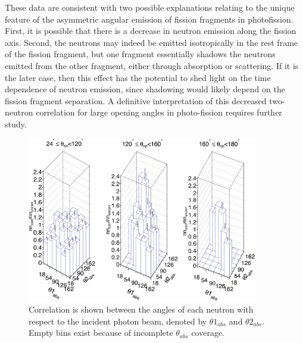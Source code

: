 These data are consistent with two possible explanations relating to the unique feature of the asymmetric angular emission of fission fragments in photofission.
First, it is possible that there is a decrease in neutron emission along the fission axis.
Second, the neutrons may indeed be emitted isotropically in the rest frame of the fission fragment, but one fragment essentially shadows the neutrons emitted from the other fragment, either through absorption or scattering.
If it is the later case, then this effect has the potential to shed light on the time dependence of neutron emission, since shadowing would likely depend on the fission fragment separation.
A definitive interpretation of this decreased two-neutron correlation for large opening angles in photo-fission requires further study.

\begin{figure}
\centering
    \includegraphics[width = 0.9\textwidth]{Content/Results/theta_abs_LEGO.png}
    \caption{Correlation is shown between the angles of each neutron with respect to the incident photon beam, denoted by $\theta 1_{abs}$ and $\theta 2_{abs}$.
    Empty bins exist because of incomplete $\theta_{abs}$ coverage.}
    \label{fig:theta_abs_LEGO}
\end{figure}
